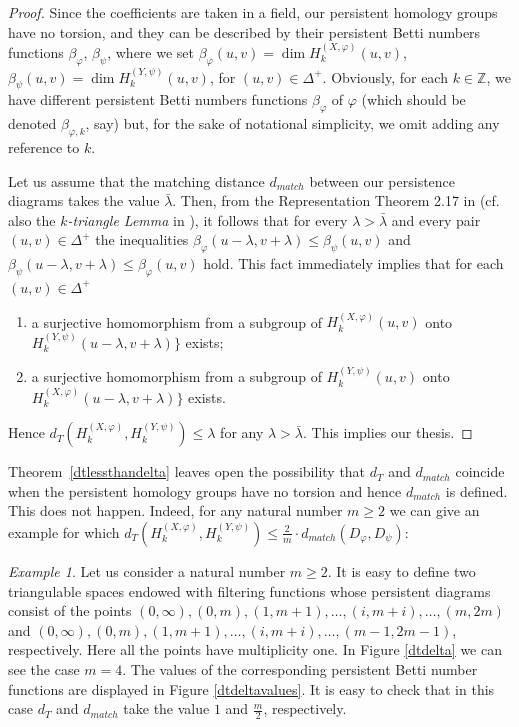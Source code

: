 \documentclass{amsart}
\theoremstyle{definition}
\theoremstyle{remark}
\newtheorem{example}[theorem]{Example}
\numberwithin{equation}{section}
\begin{document}
\begin{proof} Since the coefficients are taken in a field, our persistent homology groups have no torsion, and they can be described by their persistent Betti numbers functions $\beta_\varphi$, $\beta_\psi$, where we set
$\beta_\varphi(u,v)=\dim {H}_k^{(X,\varphi)}(u, v)$, $\beta_\psi(u,v)=\dim {H}_k^{(Y,\psi)}(u, v)$, for $(u,v)\in \Delta^+$.
Obviously, for each $k\in\mathbb{Z}$, we have different persistent Betti numbers functions
$\beta_\varphi$ of $\varphi$ (which should be denoted
$\beta_{\varphi,k}$, say) but, for the sake of notational
simplicity,  we omit adding any reference to $k$.

Let us assume that the matching distance $d_{match}$ between our persistence diagrams takes the value $\bar \lambda$. Then, from the Representation Theorem 2.17 in \cite{CeDiFeFrLa09} (cf. also the \emph{$k$-triangle Lemma} in \cite{CoEdHa07}), it follows that for every $\lambda>\bar\lambda$ and every pair $(u,v)\in \Delta^+$ the inequalities $\beta_\varphi(u-\lambda,v+ \lambda)\leq\beta_\psi(u,v)$ and $\beta_\psi(u-\lambda,v+\lambda)\leq\beta_\varphi(u,v)$ hold. This fact immediately implies that for each $(u,v)\in \Delta^+$
\begin{enumerate}
\item a surjective homomorphism from a subgroup of $ H^{(X,\varphi)}_k(u,v)$ onto $ H^{(Y,\psi)}_k(u-\lambda,v+\lambda)\}$ exists;
\item a surjective homomorphism from a subgroup of $ H^{(Y,\psi)}_k(u,v)$ onto $ H^{(X,\varphi)}_k(u-\lambda,v+\lambda)\}$ exists.
\end{enumerate}
Hence $d_T\left( H^{(X,\varphi)}_k, H^{(Y,\psi)}_k\right)\le\lambda$ for any $\lambda>\bar\lambda$. This implies our thesis.
 \end{proof}



Theorem~\ref{dtlessthandelta} leaves open the possibility that $d_T$ and $d_{match}$ coincide when the persistent homology groups have no torsion and hence $d_{match}$ is defined. This does not happen. Indeed, for any natural number $m\ge 2$ we can give an example for which
$d_T\left( H^{(X,\varphi)}_k, H^{(Y,\psi)}_k\right)\le \frac{2}{m}\cdot d_{match}(D_\varphi,D_\psi)$:

\begin{example}\label{ex1}
Let us consider a natural number $m\ge 2$. It is easy to define two triangulable spaces endowed with filtering functions whose persistent diagrams consist of the points  $(0,\infty),(0,m),(1,m+1),\ldots,(i,m+i),\ldots,(m,2m)$ and $(0,\infty),(0,m),(1,m+1),\ldots,(i,m+i),\ldots,(m-1,2m-1)$, respectively. Here all the points have multiplicity one. In Figure \ref{dtdelta} we can see the case $m=4$. The values of the corresponding persistent Betti number functions are displayed in Figure \ref{dtdeltavalues}. It is easy to check that in this case $d_T$ and $d_{match}$ take the value $1$ and $\frac{m}{2}$, respectively.
\end{example}
\end{document}
